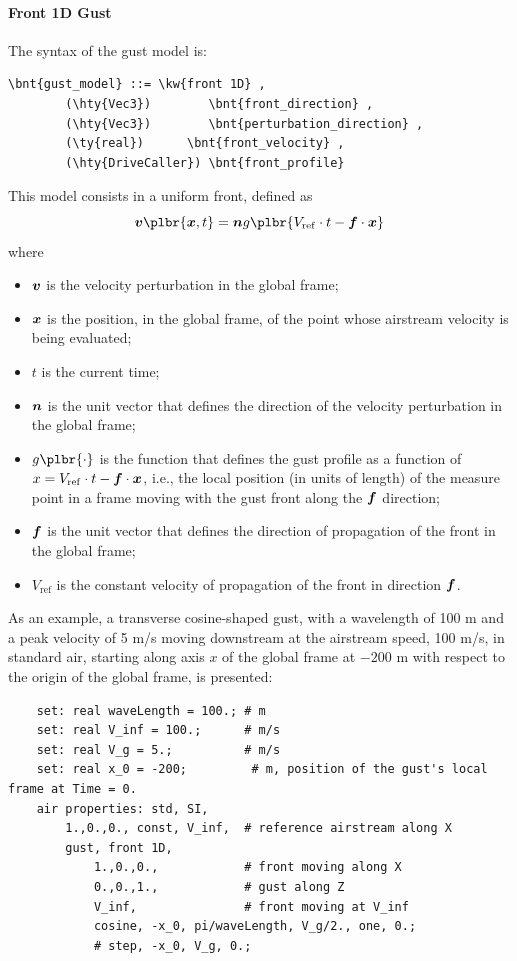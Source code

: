 \paragraph{Front 1D Gust}
The syntax of the  gust model is:
\begin{Verbatim}[commandchars=\\\{\}]
    \bnt{gust_model} ::= \kw{front 1D} ,
        (\hty{Vec3})        \bnt{front_direction} ,
        (\hty{Vec3})        \bnt{perturbation_direction} ,
        (\ty{real})      \bnt{front_velocity} ,
        (\hty{DriveCaller}) \bnt{front_profile}
\end{Verbatim}
This model consists in a uniform front, defined as
\begin{displaymath}
	\T{v}\plbr{\T{x}, t} = \T{n} g\plbr{V_\mathrm{ref} \cdot t - \T{f} \cdot \T{x}}
\end{displaymath}
where
\begin{itemize}
\item $\boldsymbol{v}$ is the velocity perturbation in the global frame;
\item $\boldsymbol{x}$ is the position, in the global frame, of the point whose airstream velocity
is being evaluated;
\item $t$ is the current time;
\item $\boldsymbol{n}$ is the unit vector 
that defines the direction of the velocity perturbation in the global frame;
\item $g\plbr{\cdot}$ is the function 
that defines the gust profile as a function of $x = V_\mathrm{ref} \cdot t - \boldsymbol{f} \cdot \boldsymbol{x}$, i.e., the local position (in units of length) of the measure point in a frame moving with the gust front along the $\boldsymbol{f}$ direction;
\item $\boldsymbol{f}$ is the unit vector 
that defines the direction of propagation of the front in the global frame;
\item $V_\mathrm{ref}$ is the constant velocity 
of propagation of the front in direction $\boldsymbol{f}$.
\end{itemize}
As an example, a transverse cosine-shaped gust, with a wavelength of 100 m
and a peak velocity of 5 m/s moving downstream at the airstream speed,
100 m/s, in standard air, starting along axis $x$ of the global frame at $-200$ m with respect to the origin of the global frame, is presented:
\begin{verbatim}
    set: real waveLength = 100.; # m
    set: real V_inf = 100.;      # m/s
    set: real V_g = 5.;          # m/s
    set: real x_0 = -200;         # m, position of the gust's local frame at Time = 0.
    air properties: std, SI,
        1.,0.,0., const, V_inf,  # reference airstream along X
        gust, front 1D,
            1.,0.,0.,            # front moving along X
            0.,0.,1.,            # gust along Z
            V_inf,               # front moving at V_inf
            cosine, -x_0, pi/waveLength, V_g/2., one, 0.;
            # step, -x_0, V_g, 0.;
\end{verbatim}
